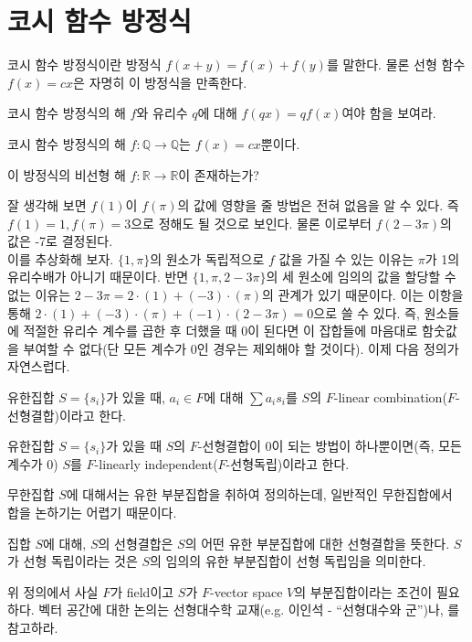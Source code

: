 \section{코시 함수 방정식}
코시 함수 방정식이란 방정식 $f(x+y)=f(x)+f(y)$를 말한다. 물론 선형 함수 $f(x)=cx$은 자명히 이 방정식을 만족한다. 
\begin{exercise}
    코시 함수 방정식의 해 $f$와 유리수 $q$에 대해 $f(qx)=qf(x)$여야 함을 보여라. 
\end{exercise}
\begin{corollary}
코시 함수 방정식의 해 $f: \mathbb{Q}\to\mathbb{Q}$는 $f(x)=cx$뿐이다. 
\end{corollary}
\begin{question}
이 방정식의 비선형 해 $f: \mathbb{R}\to\mathbb{R}$이 존재하는가?
\end{question}
잘 생각해 보면 $f(1)$이 $f(\pi)$의 값에 영향을 줄 방법은 전혀 없음을 알 수 있다. 즉 $f(1)=1, f(\pi)=3$으로 정해도 될 것으로 보인다. 물론 이로부터 $f(2-3\pi)$의 값은 -7로 결정된다. \\
이를 추상화해 보자. $\{1, \pi\}$의 원소가 독립적으로 $f$ 값을 가질 수 있는 이유는 $\pi$가 1의 유리수배가 아니기 때문이다. 반면 
 $\{1, \pi, 2-3\pi\}$의 세 원소에 임의의 값을 할당할 수 없는 이유는 $2-3\pi=2\cdot(1)+(-3)\cdot(\pi)$의 관계가 있기 때문이다. 이는 이항을 통해 $2\cdot(1)+(-3)\cdot(\pi)+(-1)\cdot(2-3\pi)=0$으로 쓸 수 있다. 즉, 원소들에 적절한 유리수 계수를 곱한 후 더했을 때 0이 된다면 이 잡합들에 마음대로 함숫값을 부여할 수 없다(단 모든 계수가 0인 경우는 제외해야 할 것이다). 이제 다음 정의가 자연스럽다. 
\begin{definition}
유한집합 $S=\{s_i\}$가 있을 때, $a_i\in F$에 대해 $\sum a_is_i$를 $S$의 $F$-linear combination($F$-선형결합)이라고 한다. 
\end{definition}
\begin{definition}
유한집합 $S=\{s_i\}$가 있을 때 $S$의 $F$-선형결합이 0이 되는 방법이 하나뿐이면(즉, 모든 계수가 0) $S$를 $F$-linearly independent($F$-선형독립)이라고 한다. 
\end{definition}
무한집합 $S$에 대해서는 유한 부분집합을 취하여 정의하는데, 일반적인 무한집합에서 합을 논하기는 어렵기 때문이다. 
\begin{definition}
    집합 $S$에 대해, $S$의 선형결합은 $S$의 어떤 유한 부분집합에 대한 선형결합을 뜻한다. $S$가 선형 독립이라는 것은 $S$의 임의의 유한 부분집합이 선형 독립임을 의미한다. 
\end{definition}
\begin{remark}
위 정의에서 사실 $F$가 field이고 $S$가 $F$-vector space $V$의 부분집합이라는 조건이 필요하다. 벡터 공간에 대한 논의는 선형대수학 교재(e.g. 이인석 - ``선형대수와 군'')나, 를 참고하라. 
\end{remark}
